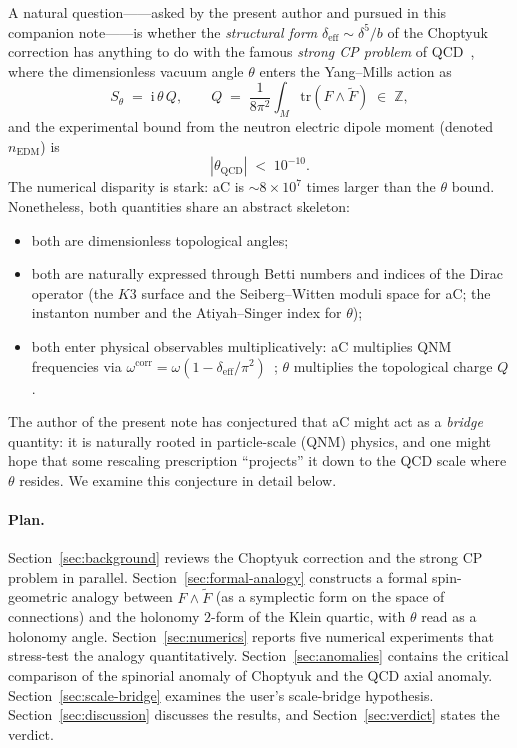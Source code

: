 \documentclass[11pt,a4paper]{article}
\newcommand{\aC}{a\text{-}C}
\newcommand{\deff}{\delta_{\mathrm{eff}}}
\providecommand{\ii}{}
\renewcommand{\ii}{\mathrm{i}}
\providecommand{\nb}{}
\renewcommand{\nb}{n_{\mathrm{EDM}}}
\renewcommand{\tr}{\mathrm{tr}}
\theoremstyle{plain}
\theoremstyle{definition}
\theoremstyle{remark}
\begin{document}
A natural question——asked by the present author and pursued in this
companion note——is whether the \emph{structural form}
$\deff \sim \delta^5/b$ of the Choptyuk correction has anything to do
with the famous \emph{strong CP problem} of QCD~\cite{tHooft1976,
  pecceiquinn1977, kim1987axion, dvali2005cp}, where the dimensionless
vacuum angle $\theta$ enters the Yang--Mills action as
\begin{equation}\label{eq:theta-term}
  S_\theta \;=\; \ii\,\theta\, Q, \qquad
  Q \;=\; \frac{1}{8\pi^2}\int_M \tr\!\left(F\wedge \tilde F\right)
       \;\in\; \mathbb{Z},
\end{equation}
and the experimental bound from the neutron electric dipole moment
(denoted $\nb$) is
\begin{equation}\label{eq:nEDM-bound}
  |\theta_{\mathrm{QCD}}| \;<\; 10^{-10}.
\end{equation}
The numerical disparity is stark: \aC{} is $\sim 8\times 10^7$ times
larger than the $\theta$ bound.  Nonetheless, both quantities share an
abstract skeleton:
\begin{itemize}[leftmargin=2em,itemsep=0.1em]
  \item both are dimensionless topological angles;
  \item both are naturally expressed through Betti numbers and indices
        of the Dirac operator (the $K3$ surface and the Seiberg--Witten
        moduli space for \aC{}; the instanton number and the
        Atiyah--Singer index for $\theta$);
  \item both enter physical observables multiplicatively: \aC{}
        multiplies QNM frequencies via
        $\omega^{\mathrm{corr}}=\omega(1-\deff/\pi^2)$~\cite{isaev2024spinor};
        $\theta$ multiplies the topological charge $Q$.
\end{itemize}
The author of the present note has conjectured that \aC{} might act as
a \emph{bridge} quantity: it is naturally rooted in particle-scale
(QNM) physics, and one might hope that some rescaling prescription
``projects'' it down to the QCD scale where $\theta$ resides.  We
examine this conjecture in detail below.

\paragraph{Plan.}
Section~\ref{sec:background} reviews the Choptyuk correction and the
strong CP problem in parallel.  Section~\ref{sec:formal-analogy}
constructs a formal spin-geometric analogy between $F\wedge\tilde F$
(as a symplectic form on the space of connections) and the holonomy
$2$-form of the Klein quartic, with $\theta$ read as a holonomy angle.
Section~\ref{sec:numerics} reports five numerical experiments that
stress-test the analogy quantitatively.  Section~\ref{sec:anomalies}
contains the critical comparison of the spinorial anomaly of Choptyuk
and the QCD axial anomaly.  Section~\ref{sec:scale-bridge} examines the
user's scale-bridge hypothesis.  Section~\ref{sec:discussion} discusses
the results, and Section~\ref{sec:verdict} states the verdict.
\end{document}
